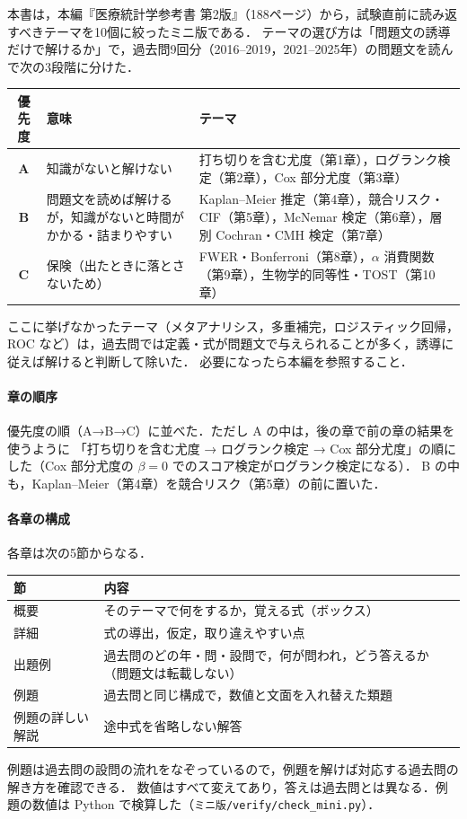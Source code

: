 \documentclass[a4paper,11pt,openany]{ltjsbook}
\begin{document}
本書は，本編『医療統計学参考書 第2版』（188ページ）から，試験直前に読み返すべきテーマを10個に絞ったミニ版である．
テーマの選び方は「問題文の誘導だけで解けるか」で，過去問9回分（2016--2019，2021--2025年）の問題文を読んで次の3段階に分けた．

\begin{center}\small
\begin{tabular}{@{}cL{50mm}L{80mm}@{}}
\toprule
優先度 & 意味 & テーマ\\
\midrule
\textbf{A} & 知識がないと解けない & 打ち切りを含む尤度（第1章），ログランク検定（第2章），Cox 部分尤度（第3章）\\
\textbf{B} & 問題文を読めば解けるが，知識がないと時間がかかる・詰まりやすい & Kaplan--Meier 推定（第4章），競合リスク・CIF（第5章），McNemar 検定（第6章），層別 Cochran・CMH 検定（第7章）\\
\textbf{C} & 保険（出たときに落とさないため） & FWER・Bonferroni（第8章），$\alpha$ 消費関数（第9章），生物学的同等性・TOST（第10章）\\
\bottomrule
\end{tabular}
\end{center}
ここに挙げなかったテーマ（メタアナリシス，多重補完，ロジスティック回帰，ROC など）は，過去問では定義・式が問題文で与えられることが多く，誘導に従えば解けると判断して除いた．
必要になったら本編を参照すること．

\paragraph{章の順序}
優先度の順（A→B→C）に並べた．ただし A の中は，後の章で前の章の結果を使うように
「打ち切りを含む尤度 → ログランク検定 → Cox 部分尤度」の順にした（Cox 部分尤度の $\beta=0$ でのスコア検定がログランク検定になる）．
B の中も，Kaplan--Meier（第4章）を競合リスク（第5章）の前に置いた．

\paragraph{各章の構成}
各章は次の5節からなる．
\begin{center}\small
\begin{tabular}{@{}lL{115mm}@{}}
\toprule
節 & 内容\\
\midrule
概要 & そのテーマで何をするか，覚える式（ボックス）\\
詳細 & 式の導出，仮定，取り違えやすい点\\
出題例 & 過去問のどの年・問・設問で，何が問われ，どう答えるか（問題文は転載しない）\\
例題 & 過去問と同じ構成で，数値と文面を入れ替えた類題\\
例題の詳しい解説 & 途中式を省略しない解答\\
\bottomrule
\end{tabular}
\end{center}
例題は過去問の設問の流れをなぞっているので，例題を解けば対応する過去問の解き方を確認できる．
数値はすべて変えてあり，答えは過去問とは異なる．例題の数値は Python で検算した（\texttt{ミニ版/verify/check\_mini.py}）．
\end{document}
